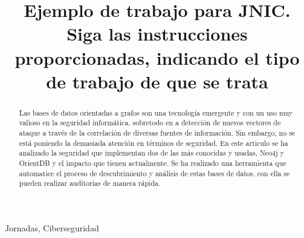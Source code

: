 \documentclass[10pt,conference,a4paper]{IEEEtran}
\begin{document}
\title{Ejemplo de trabajo para JNIC. Siga las instrucciones proporcionadas, 
indicando el tipo de trabajo de que se trata}


\author{
\and
{}
\and
{}
}


\maketitle


\begin{abstract}
Las bases de datos orientadas a grafos son una tecnología emergente y con un uso muy valioso en la seguridad informática, sobretodo en a detección de nuevos vectores de ataque a través de la correlación de diversas fuentes de información. Sin embargo, no se está poniendo la demasiada atención en términos de seguridad. En este articulo se ha analizado la seguridad que implementan dos de las más conocidas y usadas, Neo4j y OrientDB y el impacto que tienen actualmente. Se ha realizado una herramienta que automatice el proceso de descubrimiento y análisis de estas bases de datos, con ella se pueden realizar auditorias de manera rápida.\\
\end{abstract}


\begin{keywords}
Jornadas, Ciberseguridad
\end{keywords}
\end{document}

